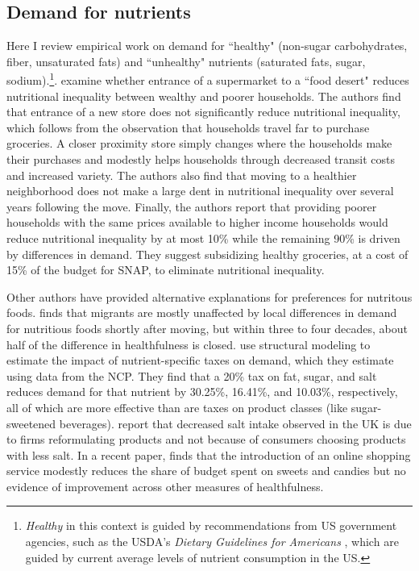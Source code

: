 \documentclass[12pt]{article}
\begin{document}
\subsection{Demand for nutrients}

Here I review empirical work on demand for ``healthy" (non-sugar carbohydrates, fiber, unsaturated fats) and ``unhealthy" nutrients (saturated fats, sugar, sodium).\footnote{\textit{Healthy} in this context is guided by recommendations from US government agencies, such as the USDA's \textit{Dietary Guidelines for Americans} \citeyear{usda2021}, which are guided by current average levels of nutrient consumption in the US.}.
\textcite{allcott2019food} examine whether entrance of a supermarket to a ``food desert" reduces nutritional inequality between wealthy and poorer households.
The authors find that entrance of a new store does not significantly reduce nutritional inequality, which follows from the observation that households travel far to purchase groceries.
A closer proximity store simply changes where the households make their purchases and modestly helps households through decreased transit costs and increased variety.
The authors also find that moving to a healthier neighborhood does not make a large dent in nutritional inequality over several years following the move.
Finally, the authors report that providing poorer households with the same prices available to higher income households would reduce nutritional inequality by at most 10\% while the remaining 90\% is driven by differences in demand.
They suggest subsidizing healthy groceries, at a cost of 15\% of the budget for SNAP, to eliminate nutritional inequality.

Other authors have provided alternative explanations for preferences for nutritous foods.
\textcite{hut2020determinants} finds that migrants are mostly unaffected by local differences in demand for nutritious foods shortly after moving, but within three to four decades, about half of the difference in healthfulness is closed.
\textcite{harding2017effect} use structural modeling to estimate the impact of nutrient-specific taxes on demand, which they estimate using data from the NCP.
They find that a 20\% tax on fat, sugar, and salt reduces demand for that nutrient by 30.25\%, 16.41\%, and 10.03\%, respectively, all of which are more effective than are taxes on product classes (like sugar-sweetened beverages).
\textcite{griffith2017importance} report that decreased salt intake observed in the UK is due to firms reformulating products and not because of consumers choosing products with less salt.
In a recent paper, \textcite{harris2020online} finds that the introduction of an online shopping service modestly reduces the share of budget spent on sweets and candies but no evidence of improvement across other measures of healthfulness.
\end{document}
